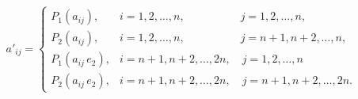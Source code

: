 \documentclass[a4paper,11pt]{article}
\begin{document}
\begin{equation}
  \label{eq:Wojtynski-93}
  a'_{ i j } =
  \begin{cases}
    P_{ 1 }( a_{ i j } ), &i = 1, 2, \ldots, n, \qquad \qquad \quad
                            j = 1, 2, \ldots, n, \\
    P_{ 2 }( a_{ i j } ), &i = 1, 2, \ldots, n, \qquad \qquad \quad
                            j = n + 1, n + 2, \ldots, n, \\
    P_{ 1 }( a_{ i j } \, e_{ 2 } ), &i = n + 1, n + 2, \ldots, 2n, \quad
                                       j = 1, 2, \ldots, n \\
    P_{ 2 }( a_{ i j } \, e_{ 2 } ), &i = n + 1, n + 2, \ldots, 2n, \quad
                                       j = n + 1, n + 2, \ldots, 2n.
  \end{cases}
\end{equation}














\newpage


\vspace{\spaceFive}
\end{document}

